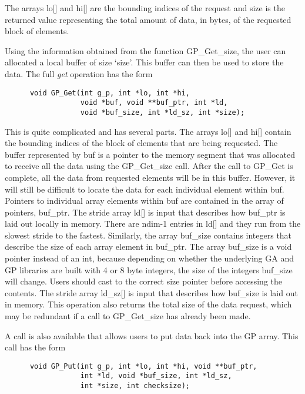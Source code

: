 \noindent
The arrays lo[] and hi[] are the bounding indices of the request and size is the
returned value representing the total amount of data, in bytes, of the requested
block of elements.

Using the information obtained from the function GP\_Get\_size, the user can
allocated a local buffer of size `size'. This buffer can then be used to store
the data. The full \emph{get} operation has the form

\begin{verbatim}
      void GP_Get(int g_p, int *lo, int *hi,
                  void *buf, void **buf_ptr, int *ld,
                  void *buf_size, int *ld_sz, int *size);
\end{verbatim}

\noindent
This is quite complicated and has several parts. The arrays lo[] and hi[]
contain the bounding indices of the block of elements that are being requested.
The buffer represented by buf is a pointer to the memory segment that was
allocated to receive all the data using the GP\_Get\_size call. After the call
to GP\_Get is complete, all the data from requested elements will be in this
buffer. However, it will still be difficult to locate the data for each
individual element within buf. Pointers to individual array elements within buf
are contained in the array of pointers, buf\_ptr. The stride array ld[] is input
that describes how buf\_ptr is laid out locally in memory. There are ndim-1
entries in ld[] and they run from the slowest stride to the fastest.  Similarly,
the array buf\_size
contains integers that describe the size of each array element in buf\_ptr. The
array buf\_size is a void pointer instead of an int, because depending on
whether the underlying GA and GP libraries are built with 4 or 8 byte integers,
the size of the integers buf\_size will change. Users should cast to the correct
size pointer before accessing the contents. The stride array ld\_sz[] is input
that describes how buf\_size is laid out in memory.  This operation also returns
the total size of the data request, which may be redundant if a call to
GP\_Get\_size has already been made.

A call is also available that allows users to put data back into the GP array.
This call has the form

\begin{verbatim}
      void GP_Put(int g_p, int *lo, int *hi, void **buf_ptr,
                  int *ld, void *buf_size, int *ld_sz,
                  int *size, int checksize);
\end{verbatim}

